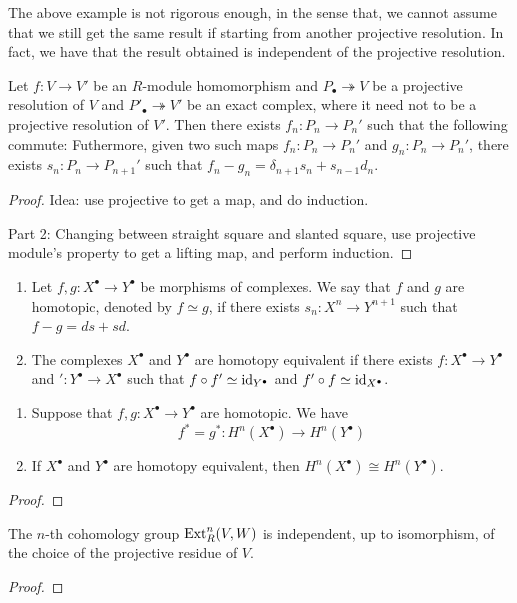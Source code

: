 \medskip

\begin{re}
    The above example is not rigorous enough, in the sense that, we cannot assume that we still get the same result if starting from another projective resolution. In fact, we have that the result obtained is independent of the projective resolution.
\end{re}

\medskip

\begin{pro} 
    Let $f:V\to V'$ be an $R$-module homomorphism and $P_\bullet\twoheadrightarrow V$ be a projective resolution of $V$ and $P'_\bullet \twoheadrightarrow V'$ be an exact complex, where it need not to be a projective resolution of $V'$. Then there exists $f_n:P_n\to P_n'$ such that the following commute:
    Futhermore, given two such maps $f_n:P_n \to P_n'$ and $g_n:P_n\to P_n'$, there exists $s_n:P_n \to P_{n+1}'$ such that $f_n-g_n=\delta_{n+1}s_n + s_{n-1}d_n$.
\end{pro}
\begin{proof}
    Idea: use projective to get a map, and do induction.

    Part 2: Changing between straight square and slanted square, use projective module's property to get a lifting map, and perform induction.

\end{proof}

\begin{defn}
    \hfill

    \begin{enumerate}
        \item Let $f,g: X^\bullet \to Y^\bullet$ be morphisms of complexes. We say that $f$ and $g$ are homotopic, denoted by $f\simeq g$, if there exists $s_n: X^n \to Y^{n+1}$ such that $f-g = ds + sd$.
        \item The complexes $X^\bullet$ and $Y^\bullet$ are homotopy equivalent if there exists $f:X^\bullet \to Y^\bullet$ and $':Y^\bullet \to X^\bullet$ such that $f\circ f' \simeq \operatorname{id}_{Y^\bullet}$ and $f'\circ f \simeq \operatorname{id}_{X^\bullet}$. 
    \end{enumerate}
\end{defn}

\medskip

\begin{pro}
    \hfill

    \begin{enumerate}
        \item Suppose that $f,g:X^\bullet \to Y^\bullet$ are homotopic. We have 
        \[f^* = g^* : H^n (X^\bullet) \to H^n(Y^\bullet)\]
        \item If $X^\bullet$ and $Y^\bullet$ are homotopy equivalent, then $H^n(X^\bullet)\cong H^n(Y^\bullet)$.
    \end{enumerate}
\end{pro}
\begin{proof}

\end{proof}

\begin{thm}
    The $n$-th cohomology group $\operatorname{Ext}^n_R(V,W)$ is independent, up to isomorphism, of the choice of the projective residue of $V$.
\end{thm}
\begin{proof}
\end{proof}

